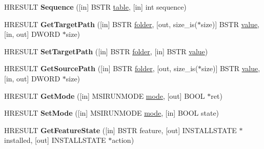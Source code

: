 \begin{DoxyCompactItemize}
H\+R\+E\+S\+U\+LT {\bfseries Sequence} (\mbox{[}in\mbox{]} B\+S\+TR \hyperlink{structtable}{table}, \mbox{[}in\mbox{]} int sequence)
\item 
\mbox{\label{interface_i_wine_msi_remote_package_acbda6fe76ae350c752eb662d1f0b7417}} 
H\+R\+E\+S\+U\+LT {\bfseries Get\+Target\+Path} (\mbox{[}in\mbox{]} B\+S\+TR \hyperlink{structfolder}{folder}, \mbox{[}out, size\+\_\+is($\ast$size)\mbox{]} B\+S\+TR \hyperlink{unionvalue}{value}, \mbox{[}in, out\mbox{]} D\+W\+O\+RD $\ast$size)
\item 
\mbox{\label{interface_i_wine_msi_remote_package_a84d9b7c07e2124b1611eae17a7e90a4c}} 
H\+R\+E\+S\+U\+LT {\bfseries Set\+Target\+Path} (\mbox{[}in\mbox{]} B\+S\+TR \hyperlink{structfolder}{folder}, \mbox{[}in\mbox{]} B\+S\+TR \hyperlink{unionvalue}{value})
\item 
\mbox{\label{interface_i_wine_msi_remote_package_a028d5331ba652377ec9be2e5cd8f916a}} 
H\+R\+E\+S\+U\+LT {\bfseries Get\+Source\+Path} (\mbox{[}in\mbox{]} B\+S\+TR \hyperlink{structfolder}{folder}, \mbox{[}out, size\+\_\+is($\ast$size)\mbox{]} B\+S\+TR \hyperlink{unionvalue}{value}, \mbox{[}in, out\mbox{]} D\+W\+O\+RD $\ast$size)
\item 
\mbox{\label{interface_i_wine_msi_remote_package_a361f88f9eec16dd257332b2a2450f6b4}} 
H\+R\+E\+S\+U\+LT {\bfseries Get\+Mode} (\mbox{[}in\mbox{]} M\+S\+I\+R\+U\+N\+M\+O\+DE \hyperlink{interfacevoid}{mode}, \mbox{[}out\mbox{]} B\+O\+OL $\ast$ret)
\item 
\mbox{\label{interface_i_wine_msi_remote_package_a82792d61066e029150dad32b4ae89904}} 
H\+R\+E\+S\+U\+LT {\bfseries Set\+Mode} (\mbox{[}in\mbox{]} M\+S\+I\+R\+U\+N\+M\+O\+DE \hyperlink{interfacevoid}{mode}, \mbox{[}in\mbox{]} B\+O\+OL state)
\item 
\mbox{\label{interface_i_wine_msi_remote_package_a878c3c66d0b1ac757006dd2afc421076}} 
H\+R\+E\+S\+U\+LT {\bfseries Get\+Feature\+State} (\mbox{[}in\mbox{]} B\+S\+TR feature, \mbox{[}out\mbox{]} I\+N\+S\+T\+A\+L\+L\+S\+T\+A\+TE $\ast$installed, \mbox{[}out\mbox{]} I\+N\+S\+T\+A\+L\+L\+S\+T\+A\+TE $\ast$action)

\end{DoxyCompactItemize}
